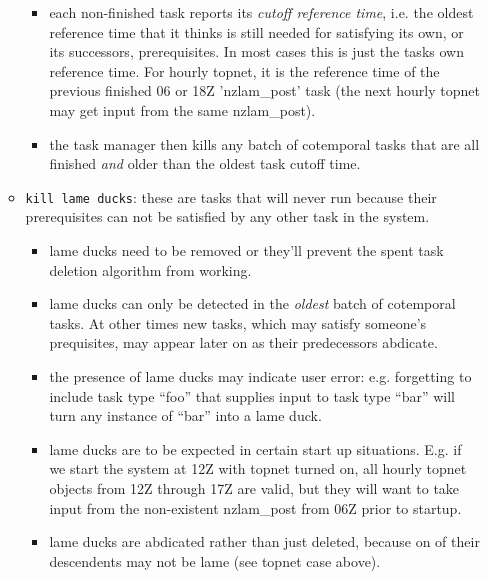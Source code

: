 \documentclass[12pt]{article}
\begin{document}
\begin{itemize}
\begin{itemize}
\begin{itemize}
       \item each non-finished task reports its {\em cutoff reference
       time}, i.e. the oldest reference time that it thinks is still
       needed for satisfying its own, or its successors, prerequisites.
       In most cases this is just the tasks own reference time. For
       hourly topnet, it is the reference time of the previous finished
       06 or 18Z 'nzlam\_post' task (the next hourly topnet may get
       input from the same nzlam\_post).  

       \item the task manager then kills any batch of cotemporal tasks
       that are all finished {\em and} older than the oldest task cutoff
       time.

       \end{itemize}

    \item \verb#kill lame ducks#: these are tasks that will never run
    because their prerequisites can not be satisfied by any other task
    in the system.  

       \begin{itemize}
       \item lame ducks need to be removed or they'll prevent the spent
       task deletion algorithm from working.
       
       \item lame ducks can only be detected in the {\em oldest} batch
       of cotemporal tasks. At other times new tasks, which may satisfy
       someone's prequisites, may appear later on as their predecessors
       abdicate.

       \item the presence of lame ducks may indicate user error: e.g.
       forgetting to include task type ``foo'' that supplies input to
       task type ``bar'' will turn any instance of ``bar'' into a lame
       duck.

       \item lame ducks are to be expected in certain start up
       situations. E.g. if we start the system at 12Z with topnet turned
       on, all hourly topnet objects from 12Z through 17Z are valid, but
       they will want to take input from the non-existent nzlam\_post
       from 06Z prior to startup.

       \item lame ducks are abdicated rather than just deleted, because
       on of their descendents may not be lame (see topnet case above). 
       \end{itemize}
   \end{itemize}
\end{itemize}
\end{document}
